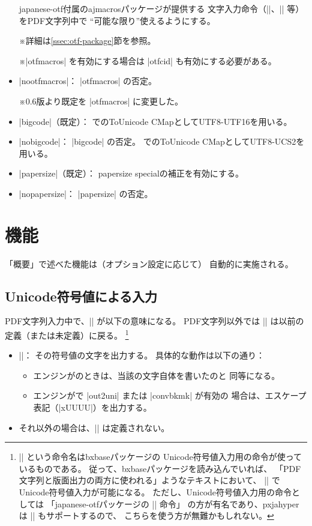 \documentclass[uplatex,dvipdfmx,a4paper]{jsarticle}
\newcommand{\Pkg}[1]{\textsf{#1}}
\newcommand{\Note}{\par\noindent ※}
\newcommand{\Means}{：\quad}
\begin{document}
\begin{itemize}
  \Pkg{japanese-otf}付属の\Pkg{ajmacros}パッケージが提供する
  文字入力命令（|\ajMaru|、|\ajLig| 等）をPDF文字列中で
  “可能な限り”使えるようにする。
  \Note 詳細は\ref{ssec:otf-package}節を参照。
  \Note |otfmacros| を有効にする場合は |otfcid| も有効にする必要がある。
\item |nootfmacros|\Means
  |otfmacros| の否定。
  \Note 0.6版より既定を |otfmacros| に変更した。
\item |bigcode|（既定）\Means
  {\upTeX}でのToUnicode CMapとしてUTF8-UTF16を用いる。
\item |nobigcode|\Means
  |bigcode| の否定。
  {\upTeX}でのToUnicode CMapとしてUTF8-UCS2を用いる。
\item |papersize|（既定）\Means
  papersize specialの補正を有効にする。
\item |nopapersize|\Means
  |papersize| の否定。
\end{itemize}

\section{機能}

「概要」で述べた機能は（オプション設定に応じて）
自動的に実施される。

\subsection{Unicode符号値による入力}
\label{ssec:ux-command}

PDF文字列入力中で、|\Ux| が以下の意味になる。
PDF文字列以外では |\Ux| は以前の定義（または未定義）に戻る。
\footnote{|\Ux| という命令名は\Pkg{bxbase}パッケージの
Unicode符号値入力用の命令が使っているものである。
従って、\Pkg{bxbase}パッケージを読み込んでいれば、
「PDF文字列と版面出力の両方に使われる」ようなテキストにおいて、
|\Ux| でUnicode符号値入力が可能になる。
ただし、Unicode符号値入力用の命令としては
「\Pkg{japanese-otf}パッケージの |\UTF| 命令」
の方が有名であり、\Pkg{pxjahyper}は |\UTF| もサポートするので、
こちらを使う方が無難かもしれない。}

\begin{itemize}
\item ||\Means
  その符号値の文字を出力する。
  具体的な動作は以下の通り：
  \begin{itemize}
  \item エンジンが{\upLaTeX}のときは、当該の文字自体を書いたのと
  同等になる。
  \item エンジンが{\pLaTeX}で |out2uni| または |convbkmk| が有効の
  場合は、エスケープ表記（|\0xUUUU|）を出力する。
  \end{itemize}
  \item それ以外の場合は、|\Ux| は定義されない。
\end{itemize}
\end{document}

